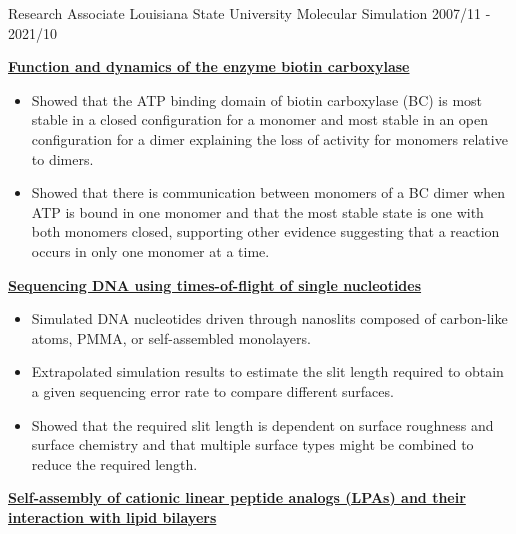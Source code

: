 \pagebreak


\begin{cventries}
  \cventry
    {Research Associate} %
    {Louisiana State University} %
    {Molecular Simulation} %
    {2007/11 - 2021/10} %
    {
        \begin{cvitems} %
            \item {\textbf{\underline{Function and dynamics of the enzyme biotin carboxylase}}}
                \vspace{2pt}
                \begin{itemize}
                \item {Showed that the ATP binding domain of biotin carboxylase (BC) is most stable in a closed configuration for a monomer and most stable in an open configuration for a dimer explaining the loss of activity for monomers relative to dimers.}
                \item {Showed that there is communication between monomers of a BC dimer when ATP is bound in one monomer and that the most stable state is one with both monomers closed, supporting other evidence suggesting that a reaction occurs in only one monomer at a time.}
                \end{itemize}
            \item {\textbf{\underline{Sequencing DNA using times-of-flight of single nucleotides}}}
                \vspace{2pt}
                \begin{itemize}
                    \item {Simulated DNA nucleotides driven through nanoslits composed of carbon-like atoms, PMMA, or self-assembled monolayers.}
                    \item {Extrapolated simulation results to estimate the slit length required to obtain a given sequencing error rate to compare different surfaces.}
                    \item {Showed that the required slit length is dependent on surface roughness and surface chemistry and that multiple surface types might be combined to reduce the required length.}
                \end{itemize}        
            \item {\textbf{\underline{Self-assembly of cationic linear peptide analogs (LPAs) and their interaction with lipid bilayers}}}

\end{cvitems}}
\end{cventries}
